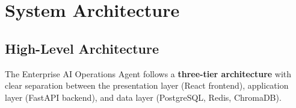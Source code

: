 \documentclass[12pt, a4paper]{report}
\begin{document}
\chapter{System Architecture}

\section{High-Level Architecture}

The Enterprise AI Operations Agent follows a \textbf{three-tier architecture} with clear separation between the presentation layer (React frontend), application layer (FastAPI backend), and data layer (PostgreSQL, Redis, ChromaDB).
\end{document}
